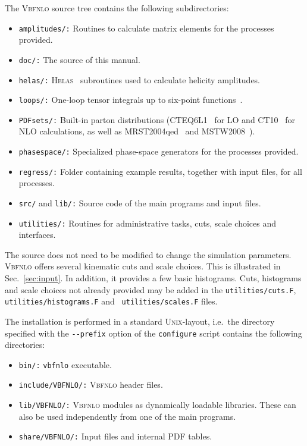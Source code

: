 \documentclass[english,12pt]{article}
\begin{document}
The \textsc{Vbfnlo} source tree contains the following subdirectories:
\begin{itemize}
\item {\tt amplitudes/:} Routines to calculate matrix elements for the processes
provided.
\item {\tt doc/:} The source of this manual.
\item {\tt helas/:} \textsc{Helas}~\cite{Murayama:1992gi} subroutines used
to calculate helicity amplitudes.
\item {\tt loops/:} One-loop tensor integrals up to six-point functions~\cite{Campanario:2011cs}.
\item {\tt PDFsets/:} Built-in parton distributions
(CTEQ6L1~\cite{Pumplin:2002vw} for LO and CT10~\cite{Lai:2010vv} for NLO
calculations, as well as MRST2004qed~\cite{Martin:2004dh} and MSTW2008~\cite{Martin:2009iq}). 
\item {\tt phasespace/:} Specialized phase-space generators for the processes
provided.
\item {\tt regress/:} Folder containing example results, together with input
files, for all processes.
\item {\tt src/} and {\tt lib/:} Source code of the main programs and input files. 
\item {\tt utilities/:} Routines for administrative tasks, cuts, scale choices
and interfaces.
\end{itemize} 

The source does not need to be modified to change the simulation parameters.
\textsc{Vbfnlo} offers several kinematic cuts and scale choices. This is
illustrated in Sec.~\ref{sec:input}. In addition, it provides a few basic
histograms. Cuts, histograms and scale choices not already provided may be
added in the {\tt utilities/cuts.F}, {\tt utilities/histograms.F} and {\tt
utilities/scales.F} files.

The installation is performed in a standard \textsc{Unix}-layout, i.e.\ the directory
specified with the {\tt -{}-prefix} option of the {\tt configure} script contains the
following directories:
\begin{itemize}
\item {\tt bin/:} {\tt vbfnlo} executable.
\item {\tt include/VBFNLO/:} \textsc{Vbfnlo} header files. 
\item {\tt lib/VBFNLO/:} \textsc{Vbfnlo} modules as dynamically loadable
  libraries. These can also
be used independently from one of the main programs.
\item {\tt share/VBFNLO/:} Input files and internal PDF tables.
\end{itemize}
\end{document}
